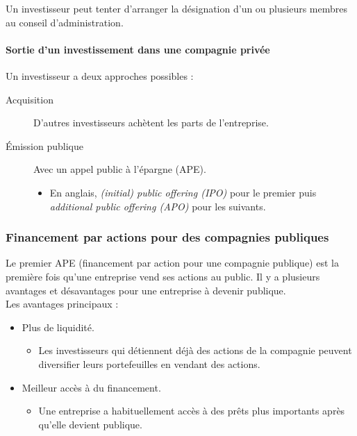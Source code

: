 \documentclass[10pt, french]{article}
\begin{document}
\begin{multicols*}{2}
\begin{definitionNOHFILLpropos}
Un investisseur peut tenter d'arranger la désignation d'un ou plusieurs membres au conseil d'administration.
\end{definitionNOHFILLpropos}


\paragraph{Sortie d'un investissement dans une compagnie privée}
Un investisseur a deux approches possibles :
\begin{description}
	\item[Acquisition]	D'autres investisseurs achètent les parts de l'entreprise.
	\item[Émission publique]	Avec un appel public à l'épargne (APE).
		\begin{itemize}
		\item	En anglais, \og \textit{(initial) public offering (IPO)} \fg{} pour le premier puis \og \textit{additional public offering (APO)} \fg{} pour les suivants.
		\end{itemize}
\end{description}


\columnbreak
\subsubsection{Financement par actions pour des compagnies publiques}
Le premier APE (financement par action pour une compagnie publique) est la première fois qu'une entreprise vend ses actions au public. Il y a plusieurs avantages et désavantages pour une entreprise à devenir publique.\\

Les avantages principaux : 
\begin{itemize}
	\item	Plus de liquidité.
		\begin{itemize}
		\item	Les investisseurs qui détiennent déjà des actions de la compagnie peuvent diversifier leurs portefeuilles en vendant des actions.
		\end{itemize}
	\item	Meilleur accès à du financement.
		\begin{itemize}
		\item	Une entreprise a habituellement accès à des prêts plus importants après qu'elle devient publique.
		\end{itemize}
\end{itemize}


\end{multicols*}
\end{document}

